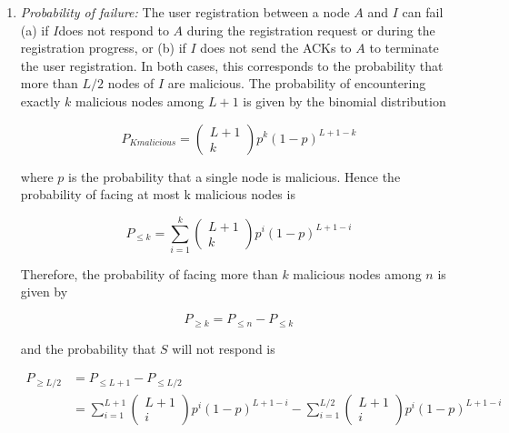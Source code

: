   \begin{enumerate}
    \item{\textit{Probability of failure:}}
    The user registration between a node $A$ and $I$ can fail (a) if $I$does
not respond to $A$ during the registration request or during the registration
progress, or (b) if $I$ does not send the ACKs to $A$ to terminate the user
registration. In both cases, this corresponds to the probability that more than
$L/2$ nodes of $I$ are malicious. The probability of encountering exactly $k$
malicious nodes among $L +1$ is given by the binomial distribution

    \begin{equation}
      P_{K malicious} = \begin{pmatrix} L+1 \\ k\end{pmatrix} p^k (1-p)^{L+1-k}
    \end{equation}

    where $p$ is the probability that a single node is malicious. Hence the
probability of facing at most k malicious nodes is 

    \begin{equation}
      P_{\leq k} = \sum_{i=1}^{k} \begin{pmatrix} L+1 \\ k\end{pmatrix} p^i (1-p)^{L+1-i}
    \end{equation}

    Therefore, the probability of facing more than $k$ malicious nodes among
$n$ is given by

    \begin{equation}
      P_{\ge k} = P_{\leq n} - P_{\leq k}
    \end{equation}

    and the probability that $S$ will not respond is

    \begin{align}
      P_{\ge L/2} &= P_{\leq L+1} - P_{\leq L/2} \\
      &= \sum_{i=1}^{L+1} \begin{pmatrix} L+1 \\ i\end{pmatrix} p^i (1-p)^{L+1-i}
      - \sum_{i=1}^{L/2} \begin{pmatrix} L+1 \\ i\end{pmatrix} p^i (1-p)^{L+1-i}
    \end{align}


\end{enumerate}
